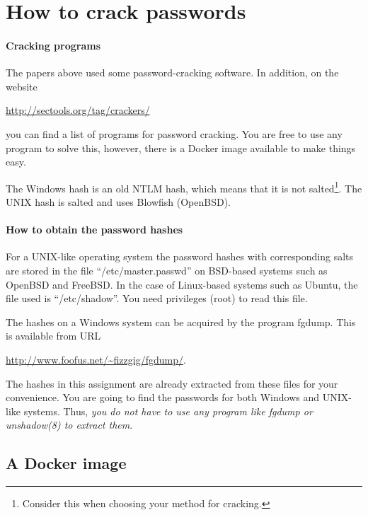 \section{How to crack passwords}%
\label{cracking}

\paragraph{Cracking programs}

The papers above used some password-cracking software.
In addition, on the website
\begin{center}
  \url{http://sectools.org/tag/crackers/}
\end{center}
you can find a list of programs for password cracking.
You are free to use any program to solve this, however, there is a Docker image 
available to make things easy.

The Windows hash is an old NTLM hash, which means that it is not 
salted\footnote{%
  Consider this when choosing your method for cracking.
}.
The UNIX hash is salted and uses Blowfish (OpenBSD).

\paragraph{How to obtain the password hashes}

For a UNIX-like operating system the password hashes with corresponding salts 
are stored in the file \enquote{/etc/master.passwd} on BSD-based systems such 
as OpenBSD and FreeBSD\@.
In the case of Linux-based systems such as Ubuntu, the file used is 
\enquote{/etc/shadow}.
You need privileges (root) to read this file.

The hashes on a Windows system can be acquired by the program fgdump.
This is available from URL
\begin{center}
  \url{http://www.foofus.net/~fizzgig/fgdump/}.
\end{center}

The hashes in this assignment are already extracted from these files for your 
convenience.
You are going to find the passwords for both Windows and UNIX-like systems.
Thus, \emph{you do not have to use any program like fgdump or unshadow(8) to 
extract them}.

\subsection{A Docker image}%
\label{Dockerfile}

